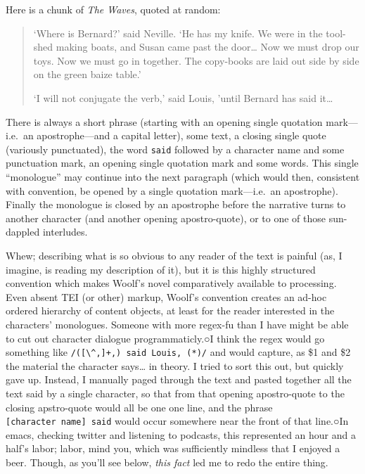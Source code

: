 \documentclass[
  12pt,
]{article}
\begin{document}
Here is a chunk of \emph{The Waves}, quoted at random:

\begin{quote}
`Where is Bernard?' said Neville. `He has my knife. We were in the
tool-shed making boats, and Susan came past the door\ldots{} Now we must
drop our toys. Now we must go in together. The copy-books are laid out
side by side on the green baize table.'

`I will not conjugate the verb,' said Louis, 'until Bernard has said
it\ldots{}
\end{quote}

There is always a short phrase (starting with an opening single
quotation mark---i.e.~an apostrophe---and a capital letter), some text,
a closing single quote (variously punctuated), the word \texttt{said}
followed by a character name and some punctuation mark, an opening
single quotation mark and some words. This single ``monologue'' may
continue into the next paragraph (which would then, consistent with
convention, be opened by a single quotation mark---i.e.~an apostrophe).
Finally the monologue is closed by an apostrophe before the narrative
turns to another character (and another opening apostro-quote), or to
one of those sun-dappled interludes.

Whew; describing what is so obvious to any reader of the text is painful
(as, I imagine, is reading my description of it), but it is this highly
structured convention which makes Woolf's novel comparatively available
to processing. Even absent TEI (or other) markup, Woolf's convention
creates an ad-hoc ordered hierarchy of content objects, at least for the
reader interested in the characters' monologues. Someone with more
regex-fu than I have might be able to cut out character dialogue
programmaticly.○{I think the regex would go something like
\texttt{/\textquotesingle{}({[}\textbackslash{}\^{},{]}+,)\textquotesingle{}\ said\ Louis,\ \textquotesingle{}(*)\textquotesingle{}/}
and would capture, as \$1 and \$2 the material the character
says\ldots{} in theory.} I tried to sort this out, but quickly gave up.
Instead, I manually paged through the text and pasted together all the
text said by a single character, so that from that opening apostro-quote
to the closing apstro-quote would all be one one line, and the phrase
\texttt{{[}character\ name{]}\ said} would occur somewhere near the
front of that line.○{In emacs, checking twitter and listening to
podcasts, this represented an hour and a half's labor; labor, mind you,
which was sufficiently mindless that I enjoyed a beer. Though, as you'll
see below, \emph{this fact} led me to redo the entire thing.}
\end{document}
